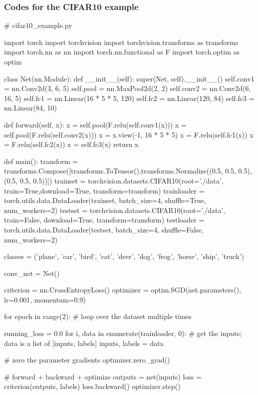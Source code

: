 \subsubsection{Codes for the CIFAR10 example}
\begin{python}
# cifar10_example.py

import torch 
import torchvision
import torchvision.transforms as transforms
import torch.nn as nn
import torch.nn.functional as F
import torch.optim as optim


class Net(nn.Module):
    def __init__(self):
        super(Net, self).__init__()
        self.conv1 = nn.Conv2d(3, 6, 5)
        self.pool = nn.MaxPool2d(2, 2)
        self.conv2 = nn.Conv2d(6, 16, 5)
        self.fc1 = nn.Linear(16 * 5 * 5, 120)
        self.fc2 = nn.Linear(120, 84)
        self.fc3 = nn.Linear(84, 10)

    def forward(self, x):
        x = self.pool(F.relu(self.conv1(x)))
        x = self.pool(F.relu(self.conv2(x)))
        x = x.view(-1, 16 * 5 * 5)
        x = F.relu(self.fc1(x))
        x = F.relu(self.fc2(x))
        x = self.fc3(x)
        return x

def main():
	transform = transforms.Compose([transforms.ToTensor(),transforms.Normalize((0.5, 0.5, 0.5), (0.5, 0.5, 0.5))])
	trainset = torchvision.datasets.CIFAR10(root='./data', train=True,download=True, transform=transform)
	trainloader = torch.utils.data.DataLoader(trainset, batch_size=4, shuffle=True, num_workers=2)
	testset = torchvision.datasets.CIFAR10(root='./data', train=False, download=True, transform=transform)
	testloader = torch.utils.data.DataLoader(testset, batch_size=4, shuffle=False, num_workers=2)

classes = ('plane', 'car', 'bird', 'cat',
           'deer', 'dog', 'frog', 'horse', 'ship', 'truck')

conv_net = Net()

criterion = nn.CrossEntropyLoss()
optimizer = optim.SGD(net.parameters(), lr=0.001, momentum=0.9)

for epoch in range(2):  # loop over the dataset multiple times

    running_loss = 0.0
    for i, data in enumerate(trainloader, 0):
        # get the inputs; data is a list of [inputs, labels]
        inputs, labels = data

        # zero the parameter gradients
        optimizer.zero_grad()

        # forward + backward + optimize
        outputs = net(inputs)
        loss = criterion(outputs, labels)
        loss.backward()
        optimizer.step()


\end{python}
